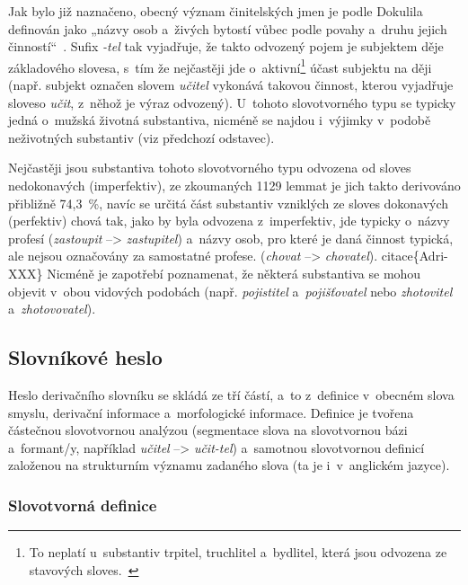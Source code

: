 Jak bylo již naznačeno, obecný význam činitelských jmen je podle
Dokulila definován jako „názvy osob a~živých bytostí vůbec podle povahy
a~druhu jejich činností``~\parencite[17]{dokulil67}. Sufix \emph{-tel}
tak vyjadřuje, že takto odvozený pojem je subjektem děje základového
slovesa, s~tím že nejčastěji jde
o~aktivní\footnote{To neplatí u~substantiv trpitel, truchlitel a~bydlitel, která jsou odvozena ze stavových sloves.~\parencite[17]{dokulil67}}
účast subjektu na ději (např. subjekt označen slovem \emph{učitel}
vykonává takovou činnost, kterou vyjadřuje sloveso \emph{učit}, z~něhož
je výraz odvozený). U~tohoto slovotvorného typu se typicky jedná
o~mužská životná substantiva, nicméně se najdou i~výjimky v~podobě
neživotných substantiv (viz předchozí odstavec).~\parencite{simandl2016}

Nejčastěji jsou substantiva tohoto slovotvorného typu odvozena od sloves
nedokonavých (imperfektiv), ze zkoumaných 1129 lemmat je jich takto
derivováno přibližně 74,3~\%, navíc se určitá část substantiv vzniklých
ze sloves dokonavých (perfektiv) chová tak, jako by byla odvozena
z~imperfektiv, jde typicky o~názvy profesí (\emph{zastoupit}
--\textgreater{} \emph{zastupitel}) a~názvy osob, pro které je daná
činnost typická, ale nejsou označovány za samostatné profese.
(\emph{chovat} --\textgreater{} \emph{chovatel}). citace\{Adri-XXX\}
Nicméně je zapotřebí poznamenat, že některá substantiva se mohou objevit
v~obou vidových podobách (např. \emph{pojistitel} a~\emph{pojišťovatel}
nebo \emph{zhotovitel} a~\emph{zhotovovatel}).~\parencite{simandl2016}

\hypertarget{slovnuxedkovuxe9-heslo}{%
\subsection{Slovníkové heslo}\label{slovnuxedkovuxe9-heslo}}

Heslo derivačního slovníku se skládá ze tří částí, a~to z~definice
v~obecném slova smyslu, derivační informace a~morfologické informace.
Definice je tvořena částečnou slovotvornou analýzou (segmentace slova na
slovotvornou bázi a~formant/y, například \emph{učitel} --\textgreater{}
\emph{učit-tel}) a~samotnou slovotvornou definicí založenou na
strukturním významu zadaného slova (ta je i~v~anglickém jazyce).

\hypertarget{slovotvornuxe1-definice}{%
\subsubsection{Slovotvorná definice}\label{slovotvornuxe1-definice}}

